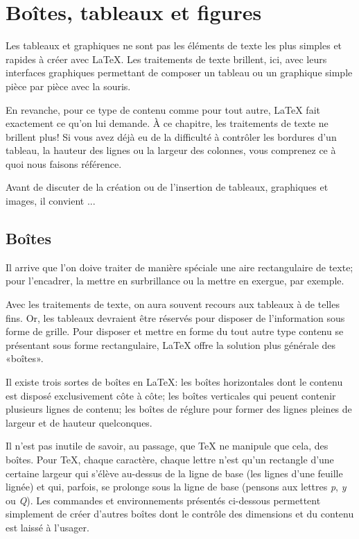 \chapter{Boîtes, tableaux et figures}
\label{chap:tableaux}

Les tableaux et graphiques ne sont pas les éléments de texte les plus
simples et rapides à créer avec {\LaTeX}. Les traitements de texte
brillent, ici, avec leurs interfaces graphiques permettant de composer
un tableau ou un graphique simple pièce par pièce avec la souris.

En revanche, pour ce type de contenu comme pour tout autre, {\LaTeX}
fait exactement ce qu'on lui demande. À ce chapitre, les traitements
de texte ne brillent plus! Si vous avez déjà eu de la difficulté à
contrôler les bordures d'un tableau, la hauteur des lignes ou la
largeur des colonnes, vous comprenez ce à quoi nous faisons référence.

Avant de discuter de la création ou de l'insertion de tableaux,
graphiques et images, il convient ...


\section{Boîtes}
\label{sec:tableaux:boites}

Il arrive que l'on doive traiter de manière spéciale une aire
rectangulaire de texte; pour l'encadrer, la mettre en surbrillance ou
la mettre en exergue, par exemple.

Avec les traitements de texte, on aura souvent recours aux tableaux à
de telles fins. Or, les tableaux devraient être réservés pour disposer
de l'information sous forme de grille. Pour disposer et mettre en
forme du tout autre type contenu se présentant sous forme
rectangulaire, {\LaTeX} offre la solution plus générale des «boîtes».

Il existe trois sortes de boîtes en {\LaTeX}: les boîtes horizontales
dont le contenu est disposé exclusivement côte à côte; les boîtes
verticales qui peu\-ent contenir plusieurs lignes de contenu; les
boîtes de réglure pour former des lignes pleines de largeur et de
hauteur quelconques.

Il n'est pas inutile de savoir, au passage, que {\TeX} ne manipule que
cela, des boîtes. Pour {\TeX}, chaque caractère, chaque lettre n'est
qu'un rectangle d'une certaine largeur qui s'élève au-dessus de la
ligne de base (les lignes d'une feuille lignée) et qui, parfois, se
prolonge sous la ligne de base (pensons aux lettres \emph{p}, \emph{y}
ou \emph{Q}). Les commandes et environnements présentés ci-dessous
permettent simplement de créer d'autres boîtes dont le contrôle des
dimensions et du contenu est laissé à l'usager.

